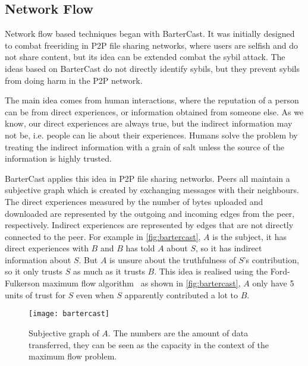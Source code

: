 
\subsection{Network Flow}\label{sec:network-flow}
Network flow based techniques began with
BarterCast\cite{meulpolder2009bartercast}. It was initially designed to combat
freeriding in P2P file sharing networks, where users are selfish and do not
share content, but its idea can be extended combat the sybil attack. The ideas
based on BarterCast do not directly identify sybils, but they prevent sybils
from doing harm in the P2P network.

The main idea comes from human interactions, where the reputation of a person
can be from direct experiences, or information obtained from someone else. As we
know, our direct experiences are always true, but the indirect information may
not be, i.e. people can lie about their experiences. Humans solve the problem by
treating the indirect information with a grain of salt unless the source of the
information is highly trusted.

BarterCast applies this idea in P2P file sharing networks. Peers all maintain a
subjective graph which is created by exchanging messages with their neighbours.
The direct experiences measured by the number of bytes uploaded and downloaded
are represented by the outgoing and incoming edges from the peer, respectively.
Indirect experiences are represented by edges that are not directly connected to
the peer. For example in \autoref{fig:bartercast}, $A$ is the subject, it has
direct experiences with $B$ and $B$ has told $A$ about $S$, so it has indirect
information about $S$. But $A$ is unsure about the truthfulness of $S$'s
contribution, so it only trusts $S$ as much as it trusts $B$. This idea is
realised using the Ford-Fulkerson maximum flow
algorithm~\cite{thomas2001introduction} as shown in \autoref{fig:bartercast},
$A$ only have 5 units of trust for $S$ even when $S$ apparently contributed a
lot to $B$.

\begin{figure}
  \centering
  \texttt{[image: bartercast]}
  \caption{Subjective graph of $A$. The numbers are the amount of data transferred,
    they can be seen as the capacity in the context of the maximum flow
    problem.}
  \label{fig:bartercast}
\end{figure}

